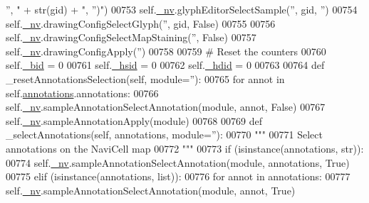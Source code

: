 \begin{DoxyCode}
{      '', "} + str(gid) + \textcolor{stringliteral}{", '')"})
00753             self.\hyperlink{classnavicom_1_1navicom_1_1NaviCom_afff3fd56fa16a68bab52ba8d801e325a}{_nv}.glyphEditorSelectSample(\textcolor{stringliteral}{''}, gid, \textcolor{stringliteral}{''})
00754             self.\hyperlink{classnavicom_1_1navicom_1_1NaviCom_afff3fd56fa16a68bab52ba8d801e325a}{_nv}.drawingConfigSelectGlyph(\textcolor{stringliteral}{''}, gid, \textcolor{keyword}{False})
00755         
00756         self.\hyperlink{classnavicom_1_1navicom_1_1NaviCom_afff3fd56fa16a68bab52ba8d801e325a}{_nv}.drawingConfigSelectMapStaining(\textcolor{stringliteral}{''}, \textcolor{keyword}{False})
00757         self.\hyperlink{classnavicom_1_1navicom_1_1NaviCom_afff3fd56fa16a68bab52ba8d801e325a}{_nv}.drawingConfigApply(\textcolor{stringliteral}{''})
00758 
00759         \textcolor{comment}{# Reset the counters}
00760         self.\hyperlink{classnavicom_1_1navicom_1_1NaviCom_a496d13fc4c8b73cef4f496b713d12b79}{_bid} = 0
00761         self.\hyperlink{classnavicom_1_1navicom_1_1NaviCom_abf768fde5caf68a79e19385b48ea0bcc}{_hsid} = 0
00762         self.\hyperlink{classnavicom_1_1navicom_1_1NaviCom_a095a4a928f1f09319fafc949f8580f78}{_hdid} = 0
00763 
00764     \textcolor{keyword}{def }\_resetAnnotationsSelection(self, module=''):
00765         \textcolor{keywordflow}{for} annot \textcolor{keywordflow}{in} self.\hyperlink{classnavicom_1_1navicom_1_1NaviCom_a0386d881214943cf3432d0ffe22cbb71}{annotations}.annotations:
00766             self.\hyperlink{classnavicom_1_1navicom_1_1NaviCom_afff3fd56fa16a68bab52ba8d801e325a}{_nv}.sampleAnnotationSelectAnnotation(module, annot, \textcolor{keyword}{False})
00767         self.\hyperlink{classnavicom_1_1navicom_1_1NaviCom_afff3fd56fa16a68bab52ba8d801e325a}{_nv}.sampleAnnotationApply(module)
00768 
00769     \textcolor{keyword}{def }\_selectAnnotations(self, annotations, module=''):
00770         \textcolor{stringliteral}{"""}
00771 \textcolor{stringliteral}{        Select annotations on the NaviCell map}
00772 \textcolor{stringliteral}{        """}
00773         \textcolor{keywordflow}{if} (isinstance(annotations, str)):
00774             self.\hyperlink{classnavicom_1_1navicom_1_1NaviCom_afff3fd56fa16a68bab52ba8d801e325a}{_nv}.sampleAnnotationSelectAnnotation(module, annotations, \textcolor{keyword}{True})
00775         \textcolor{keywordflow}{elif} (isinstance(annotations, list)):
00776             \textcolor{keywordflow}{for} annot \textcolor{keywordflow}{in} annotations:
00777                 self.\hyperlink{classnavicom_1_1navicom_1_1NaviCom_afff3fd56fa16a68bab52ba8d801e325a}{_nv}.sampleAnnotationSelectAnnotation(module, annot, \textcolor{keyword}{True})

\end{DoxyCode}
